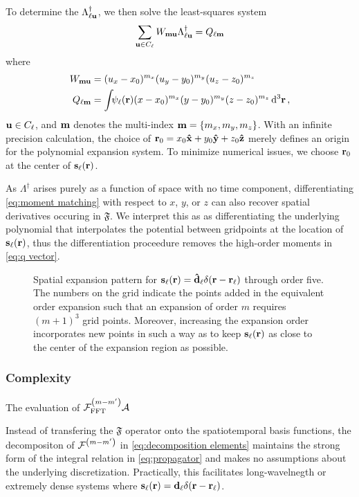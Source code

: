 To determine the $\Lambda_{\ell \vb{u}}^\dagger$, we then solve the least-squares system
\begin{equation}
  \sum_{\vb{u} \in C_\ell} W_{\vb{m}\vb{u}}\Lambda_{\ell\vb{u}}^\dagger = Q_{\ell\vb{m}}
  \label{eq:expansion matrix system}
\end{equation}
where
\begin{subequations}
  \begin{align}
    W_{\vb{m}\vb{u}} &= (u_x - x_0)^{m_x} (u_y - y_0)^{m_y} (u_z - z_0)^{m_z} \label{eq:w matrix} \\
    Q_{\ell \vb{m}} &= \int_{} \psi_\ell(\vb{r}) (x - x_0)^{m_x} (y - y_0)^{m_y} (z - z_0)^{m_z} \dd[3]{\vb{r}} \label{eq:q vector},
  \end{align}
\end{subequations}
$\vb{u} \in C_\ell$, and $\vb{m}$ denotes the multi-index $\vb{m} = \qty{m_x, m_y, m_z}$.
With an infinite precision calculation, the choice of $\vb{r}_0 = x_0 \vu{x} + y_0 \vu{y} + z_0 \vu{z}$ merely defines an origin for the polynomial expansion system.
To minimize numerical issues, we choose $\vb{r}_0$ at the center of $\vb{s}_\ell(\vb{r})$.

As $\Lambda^\dagger$ arises purely as a function of space with no time component, differentiating \cref{eq:moment matching} with respect to $x$, $y$, or $z$ can also recover spatial derivatives occuring in $\mathfrak{F}$.
We interpret this as as differentiating the underlying polynomial that interpolates the potential between gridpoints at the location of $\vb{s}_\ell(\vb{r})$, thus the differentiation proceedure removes the high-order moments in \cref{eq:q vector}.

\begin{figure}
  \centering
  \caption{\label{fig:expansion pattern}Spatial expansion pattern for $\vb{s}_\ell(\vb{r}) = \vu{d}_\ell \delta(\vb{r} - \vb{r}_\ell)$ through order five.
    The numbers on the grid indicate the points added in the equivalent order expansion such that an expansion of order $m$ requires $(m + 1)^3$ grid points.
    Moreover, increasing the expansion order incorporates new points in such a way as to keep $\vb{s}_\ell(\vb{r})$ as close to the center of the expansion region as possible.
  }
\end{figure}

\subsubsection{Complexity}

The evaluation of $\mathcal{F}_\text{FFT}^\qty(m-m') \mathcal{A}$

Instead of transfering the $\mathfrak{F}$ operator onto the spatiotemporal basis functions, the decompositon of $\mathcal{F}^\qty(m-m')$ in \cref{eq:decomposition elements} maintains the strong form of the integral relation in \cref{eq:propagator} and makes no assumptions about the underlying discretization.
Practically, this facilitates long-wavelnegth or extremely dense systems where $\vb{s}_\ell(\vb{r}) = \vb{d}_\ell \delta(\vb{r}-\vb{r}_\ell)$.
